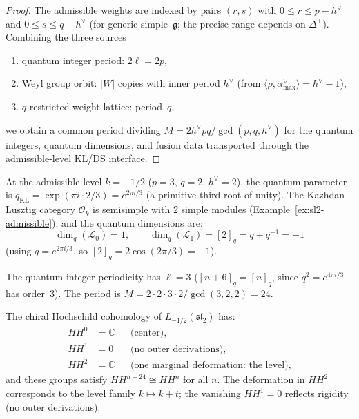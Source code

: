 \begin{proof}
The admissible weights are indexed by pairs $(r,s)$ with $0 \leq r \leq p - h^\vee$ and $0 \leq s \leq q - h^\vee$ (for generic simple~$\mathfrak{g}$; the precise range depends on $\Delta^+$).  Combining the three sources
\begin{enumerate}[label=(\alph*)]
\item quantum integer period: $2\ell = 2p$,
\item Weyl group orbit: $|W|$ copies with inner period $h^\vee$ (from $\langle \rho, \alpha^\vee_{\max} \rangle = h^\vee - 1$),
\item $q$-restricted weight lattice: period~$q$,
\end{enumerate}
we obtain a common period dividing
$M = 2h^\vee pq / \gcd(p,q,h^\vee)$ for the quantum integers, quantum
dimensions, and fusion data transported through the admissible-level
KL/DS interface.
\end{proof}

\begin{example}[Quantum periodicity for
\texorpdfstring{$\widehat{\mathfrak{sl}}_2$}{sl-hat_2} at \texorpdfstring{$k = -1/2$}{k = -1/2}]
\label{ex:hh-sl2-admissible}
At the admissible level $k = -1/2$ ($p = 3$, $q = 2$,
$h^\vee = 2$), the quantum parameter is
$q_{\mathrm{KL}} = \exp(\pi i \cdot 2/3) = e^{2\pi i/3}$
(a primitive third root of unity).  The Kazhdan--Lusztig
category $\mathcal{O}_k$ is semisimple with $2$ simple modules
(Example~\ref{ex:sl2-admissible}), and the quantum dimensions are:
\[
\dim_q(\mathcal{L}_0) = 1, \qquad
\dim_q(\mathcal{L}_1) = [2]_q = q + q^{-1} = -1
\]
(using $q = e^{2\pi i/3}$, so $[2]_q = 2\cos(2\pi/3) = -1$).

The quantum integer periodicity has $\ell = 3$
($[n+6]_q = [n]_q$, since $q^2 = e^{4\pi i/3}$ has order~$3$).
The period is $M = 2 \cdot 2 \cdot 3 \cdot 2 / \gcd(3,2,2) = 24$.

The chiral Hochschild cohomology of
$L_{-1/2}(\mathfrak{sl}_2)$ has:
\begin{align}
HH^0 &= \mathbb{C} & & \text{(center)}, \\
HH^1 &= 0 & & \text{(no outer derivations)}, \\
HH^2 &= \mathbb{C} & & \text{(one marginal deformation: the
  level)},
\end{align}
and these groups satisfy $HH^{n+24} \cong HH^n$ for all $n$.
The deformation in $HH^2$ corresponds to the level family $k \mapsto k + t$; the vanishing $HH^1 = 0$ reflects rigidity (no outer derivations).
\end{example}

